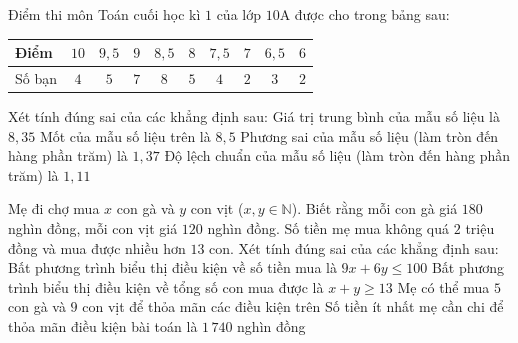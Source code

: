 \begin{ex}%
	Điểm thi môn Toán cuối học kì $1$ của lớp $10\text{A}$ được cho trong bảng sau:
	\begin{center}
		\begin{tabular}{|l|c|c|c|c|c|c|c|c|c|}
			\hline
			Điểm & $10$ & $9{,}5$ & $9$ & $8{,}5$ & $8$ & $7{,}5$ & $7$ & $6{,}5$ & $6$ \\
			\hline
			Số bạn & $4$ & $5$ & $7$ & $8$ & $5$ & $4$ & $2$ & $3$ & $2$ \\
			\hline
		\end{tabular}
	\end{center}
	Xét tính đúng sai của các khẳng định sau:
	\choiceTF
		{\True Giá trị trung bình của mẫu số liệu là $8{,}35$}
		{\True Mốt của mẫu số liệu trên là $8{,}5$}
		{Phương sai của mẫu số liệu (làm tròn đến hàng phần trăm) là $1{,}37$}
		{\True Độ lệch chuẩn của mẫu số liệu (làm tròn đến hàng phần trăm) là $1{,}11$}
\end{ex}

\begin{ex}%
	Mẹ đi chợ mua $x$ con gà và $y$ con vịt ($x,y\in\mathbb{N}$). Biết rằng mỗi con gà giá $180$ nghìn đồng, mỗi con vịt giá $120$ nghìn đồng. Số tiền mẹ mua không quá $2$ triệu đồng và mua được nhiều hơn $13$ con. Xét tính đúng sai của các khẳng định sau:
	\choiceTF
		{\True Bất phương trình biểu thị điều kiện về số tiền mua là $9x+6y\le 100$}
		{Bất phương trình biểu thị điều kiện về tổng số con mua được là $x+y\ge 13$}
		{\True Mẹ có thể mua $5$ con gà và $9$ con vịt để thỏa mãn các điều kiện trên}
		{Số tiền ít nhất mẹ cần chi để thỏa mãn điều kiện bài toán là $1\,740$ nghìn đồng}
\end{ex}

